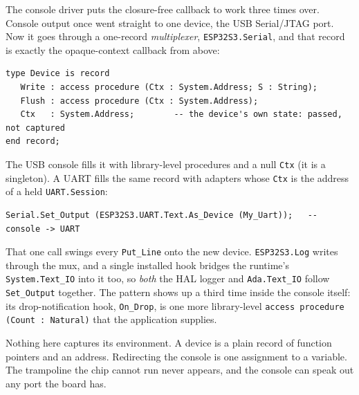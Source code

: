 The console driver puts the closure-free callback to work three times over.
Console output once went straight to one device, the USB Serial/JTAG port. Now it
goes through a one-record \emph{multiplexer}, \texttt{ESP32S3.Serial}, and that
record is exactly the opaque-context callback from above:

\begin{lstlisting}
type Device is record
   Write : access procedure (Ctx : System.Address; S : String);
   Flush : access procedure (Ctx : System.Address);
   Ctx   : System.Address;        -- the device's own state: passed, not captured
end record;
\end{lstlisting}

The USB console fills it with library-level procedures and a null \texttt{Ctx}
(it is a singleton). A UART fills the same record with adapters whose
\texttt{Ctx} is the address of a held \texttt{UART.Session}:

\begin{lstlisting}
Serial.Set_Output (ESP32S3.UART.Text.As_Device (My_Uart));   -- console -> UART
\end{lstlisting}

That one call swings every \texttt{Put\_Line} onto the new device.
\texttt{ESP32S3.Log} writes through the mux, and a single installed hook bridges
the runtime's \texttt{System.Text\_IO} into it too, so \emph{both} the HAL logger
and \texttt{Ada.Text\_IO} follow \texttt{Set\_Output} together. The pattern shows
up a third time inside the console itself: its drop-notification hook,
\texttt{On\_Drop}, is one more library-level
\texttt{access procedure (Count : Natural)} that the application supplies.

Nothing here captures its environment. A device is a plain record of function
pointers and an address. Redirecting the console is one assignment to a variable.
The trampoline the chip cannot run never appears, and the console can speak out
any port the board has.
